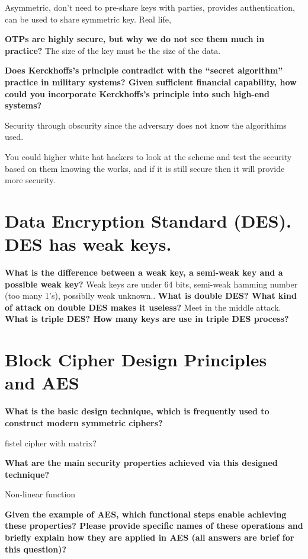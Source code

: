 \documentclass[letterpaper,11pt,notitlepage,fleqn]{article}
\begin{document}
Asymmetric, don't need to pre-share keys with parties, provides authentication, can be used to share symmetric key. Real life, 

\noindent \textbf{OTPs are highly secure, but why we do not see them much in practice?}
The size of the key must be the size of the data. 

\noindent \textbf{Does Kerckhoffs's principle contradict with the ``secret algorithm'' practice in military systems? Given sufficient financial capability, how could you incorporate Kerckhoffs's principle into such high-end systems?}

Security through obscurity since the adversary does not know the algorithims used. 

You could higher white hat hackers to look at the scheme and test the security based on them knowing the works, and if it is still secure then it will provide more security.

\section{Data Encryption Standard (DES). DES has weak keys.}
\noindent \textbf{What is the difference between a weak key, a semi-weak key and a possible weak key?}
Weak keys are under 64 bits, semi-weak hamming number (too many 1's), possiblly weak unknown..
\noindent \textbf{What is double DES?  What kind of attack on double DES makes it useless?}
Meet in the middle attack.
\noindent \textbf{What is triple DES?  How many keys are use in triple DES process?}



\section{Block Cipher Design Principles and AES}
\noindent \textbf{What is the basic design  technique,  which  is  frequently  used  to  construct  modern symmetric ciphers?}

fistel cipher with matrix?

\noindent \textbf{What are the main security properties achieved via this designed technique?}

Non-linear function

\noindent \textbf{Given the  example  of  AES,  which  functional  steps  enable achieving  these  properties?  Please provide  specific  names  of  these operations  and  briefly  explain  how  they  are  applied  in AES (all answers are brief for this question)?}
\end{document}
